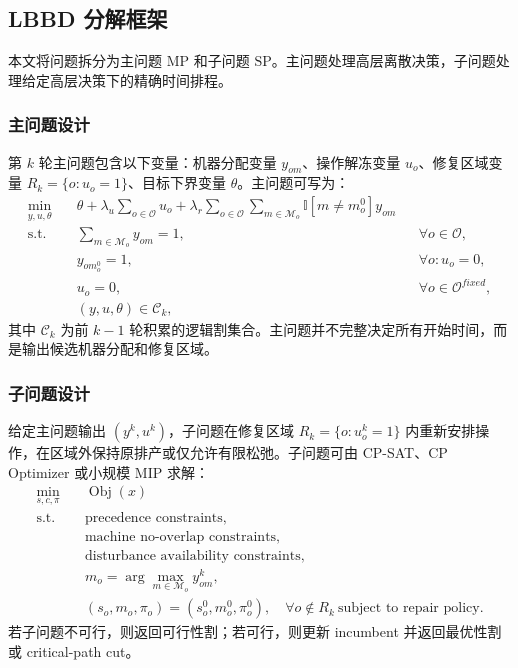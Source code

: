 \documentclass[UTF8,12pt,a4paper]{ctexart}
\newcommand{\obj}{\operatorname{Obj}}
\newcommand{\M}{\mathcal{M}}
\newcommand{\Oset}{\mathcal{O}}
\newcommand{\Cset}{\mathcal{C}}
\newcommand{\MP}{\mathrm{MP}}
\newcommand{\SP}{\mathrm{SP}}
\begin{document}
\subsection{LBBD 分解框架}

本文将问题拆分为主问题 $\MP$ 和子问题 $\SP$。主问题处理高层离散决策，子问题处理给定高层决策下的精确时间排程。

\subsubsection{主问题设计}

第 $k$ 轮主问题包含以下变量：机器分配变量 $y_{om}$、操作解冻变量 $u_o$、修复区域变量 $R_k=\{o:u_o=1\}$、目标下界变量 $\theta$。主问题可写为：
\begin{equation}
\label{eq:master}
\begin{aligned}
    \min_{y,u,\theta}\quad
    &\theta + \lambda_u\sum_{o\in\Oset}u_o + \lambda_r\sum_{o\in\Oset}\sum_{m\in\M_o}\mathbb{I}[m\neq m_o^0]y_{om} \\
    \mathrm{s.t.}\quad
    &\sum_{m\in\M_o}y_{om}=1, &&\forall o\in\Oset,\\
    &y_{om_o^0}=1, &&\forall o:u_o=0,\\
    &u_o=0, &&\forall o\in\Oset^{fixed},\\
    &(y,u,\theta)\in\Cset_k,
\end{aligned}
\end{equation}
其中 $\Cset_k$ 为前 $k-1$ 轮积累的逻辑割集合。主问题并不完整决定所有开始时间，而是输出候选机器分配和修复区域。

\subsubsection{子问题设计}

给定主问题输出 $(y^k,u^k)$，子问题在修复区域 $R_k=\{o:u_o^k=1\}$ 内重新安排操作，在区域外保持原排产或仅允许有限松弛。子问题可由 CP-SAT、CP Optimizer 或小规模 MIP 求解：
\begin{equation}
\label{eq:subproblem}
\begin{aligned}
    \min_{s,c,\pi}\quad &\obj(x)\\
    \mathrm{s.t.}\quad
    &\text{precedence constraints},\\
    &\text{machine no-overlap constraints},\\
    &\text{disturbance availability constraints},\\
    &m_o = \arg\max_{m\in\M_o} y^k_{om},\\
    &(s_o,m_o,\pi_o)=(s_o^0,m_o^0,\pi_o^0),\quad \forall o\notin R_k\ \text{subject to repair policy}.
\end{aligned}
\end{equation}
若子问题不可行，则返回可行性割；若可行，则更新 incumbent 并返回最优性割或 critical-path cut。
\end{document}
